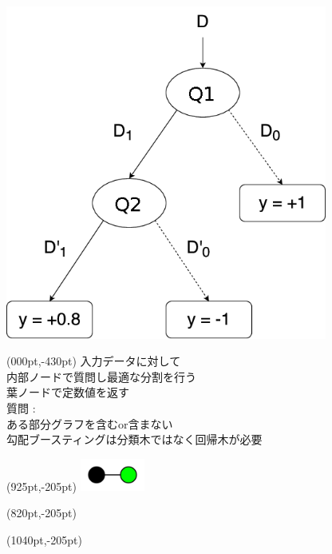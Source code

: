 \vspace{-30pt} \\
\hspace*{770pt}\includegraphics[width=300pt]{img/dtr_drawio.png}
\begin{textblock*}{\textwidth}(000pt,-430pt)
	\vspace*{160pt}
	入力データに対して \\
	内部ノードで質問し最適な分割を行う \\
	葉ノードで定数値を返す \\

	\vspace*{20pt}
	質問 : \\
	ある部分グラフを含むor含まない \\

	\vspace*{20pt}
	勾配ブースティングは分類木ではなく回帰木が必要 
\end{textblock*}
\begin{textblock*}{\textwidth}(925pt,-205pt)
	\includegraphics[width=60pt]{img/subgraph/kg.png}
\end{textblock*}
\begin{textblock*}{\textwidth}(820pt,-205pt)
	\scriptsize
	\fontsize{18pt}{0pt} 
\end{textblock*}
\begin{textblock*}{\textwidth}(1040pt,-205pt)
	\scriptsize
	\fontsize{18pt}{0pt} 
	\end{textblock*}
